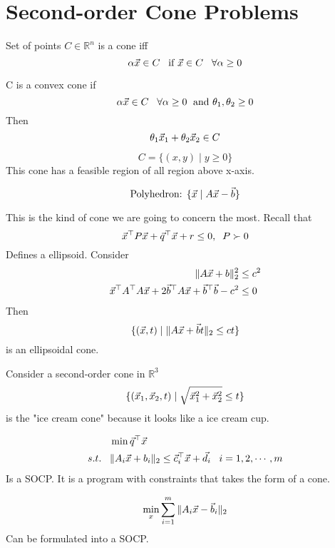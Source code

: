 \section{Second-order Cone Problems} %
\label{sec:second_order_cone_problems}

\begin{definition}[cone]
	Set of points $C\in \mathbb{R}^n$ is a cone iff
	\[
\alpha\vec{x}\in C\;\;\;\text{if }\vec{x}\in C\;\;\;\forall \alpha\ge0
	\]
\end{definition}

\begin{definition}
	C is a convex cone if
	\[
\alpha\vec{x}\in C \;\;\;\forall \alpha\ge0 \;\text{ and } \theta_1,\theta_2\ge 0
	\]
	Then 
	\[
\theta_1\vec{x}_1+\theta_2\vec{x}_2 \in C
	\]
\end{definition}

\begin{example}
	\[C = \{(x, y)\;|\;y\ge 0\}\]
	This cone has a feasible region of all region above x-axis.
\end{example}

\begin{definition}
	\[
\text{Polyhedron: }\{\vec{x}\;|\; A\vec{x}-\vec{b} \}
	\]
\end{definition}

\begin{definition}
	This is the kind of cone we are going to concern the most. Recall that
	\[
\vec{x}^\top P\vec{x}+\vec{q}^\top \vec{x}+r\le 0,\;\;P\succ0
	\]
	Defines a ellipsoid. Consider
	\begin{align*}
		\|A\vec{x}+b\|_2^2 &\le c^2 \\
		\vec{x}^\top A^\top A\vec{x}+2\vec{b}^\top A\vec{x}+\vec{b}^\top\vec{b}-c^2&\le 0
	\end{align*}
	Then \[
\{(\vec{x}, t)\;|\;\|A\vec{x}+\vec{b}t\|_2\le ct\}
	\] is an ellipsoidal cone.
\end{definition}

\begin{remark}
	Consider a second-order cone in $\mathbb{R}^3$
	\[
\{(\vec{x}_1,\vec{x}_2,t)\;|\;\sqrt{\vec{x}_1^2+\vec{x}_2^2}\le t\}
	\]
	is the "ice cream cone" because it looks like a ice cream cup.
\end{remark}

\begin{definition}[SOCP]
\begin{align*}
	&\min \vec{q}^\top\vec{x}\\
	s.t.\;\;\;&\|A_i\vec{x}+b_i\|_2\le \vec{c}_i^\top\vec{x}+\vec{d}_i \;\;\;i=1,2,\cdots,m
\end{align*}
Is a SOCP. It is a program with constraints that takes the form of a cone.
\end{definition}

\begin{example}
	\begin{align*}
		\min_x\sum_{i=1}^m\|A_i\vec{x}-\vec{b}_i\|_2
	\end{align*}
	Can be formulated into a SOCP.
\end{example}

